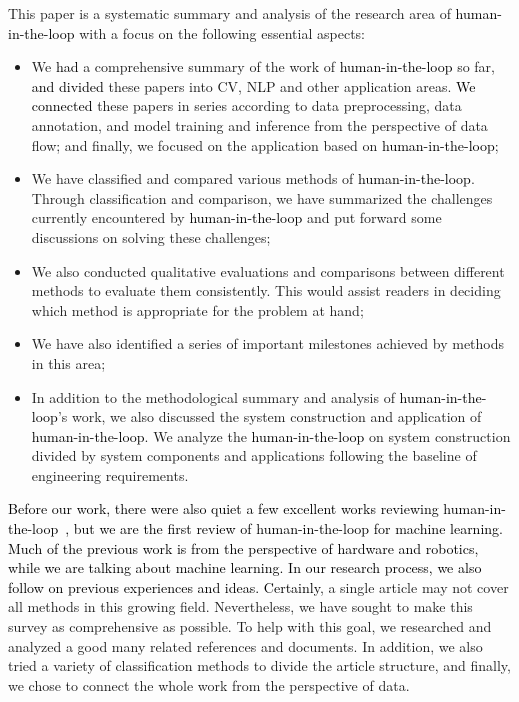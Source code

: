 \documentclass{article}
\newcommand{\REO}[1]{\textcolor{black}{#1}}
\newcommand{\ZJH}[1]{\textcolor{black}{#1}}
\begin{document}
This paper is a systematic summary and analysis of the research area of \REO{human-in-the-loop} with a focus on the following essential aspects:

\begin{itemize}
\setlength{\itemsep}{0pt}
\setlength{\parsep}{0pt}
\setlength{\parskip}{0pt}
	\item  We \ZJH{had} a comprehensive summary of the work of \REO{human-in-the-loop} so far, \ZJH{and divided} these papers into CV, NLP and other application areas. \ZJH{We connected} these papers in series according to data preprocessing, data annotation, and model training and inference from the perspective of data flow; and finally, we focused on the application based on \REO{human-in-the-loop};
	\item We have classified and compared various methods of \REO{human-in-the-loop}. Through classification and comparison, we have summarized the challenges currently encountered by \REO{human-in-the-loop} and put forward some discussions on solving these challenges;
	\item We also conducted qualitative evaluations and comparisons between different methods to evaluate them consistently. This would assist readers in deciding which method is appropriate for the problem at hand;
    \item  We have also identified a series of important milestones achieved by methods in this area;
	\item In addition to the methodological summary and analysis of \REO{human-in-the-loop}'s work, we also discussed the system construction and application of \REO{human-in-the-loop}. We analyze the \REO{human-in-the-loop} on system construction divided by system components and applications following the baseline of engineering requirements.
\end{itemize}

\REO{Before our work, there were also quiet a few excellent works reviewing human-in-the-loop~\cite{budd2021survey,jung2019human,agnisarman2019survey,benedikt2020human,chai2020human,tehrani2019review}, but we are the first review of human-in-the-loop for machine learning. Much of the previous work is from the perspective of hardware and robotics, \ZJH{while} we are talking about machine learning. In our research process, we also follow on previous experiences and ideas.}
\ZJH{Certainly}, a single article may not cover all methods in this growing field. Nevertheless, we have sought to make this survey as comprehensive as possible.
To help with this goal, we researched and analyzed a good many related references and documents. In addition, we also tried a variety of classification methods to divide the article structure, and finally, we chose to connect the whole work from the perspective of data.
\end{document}
